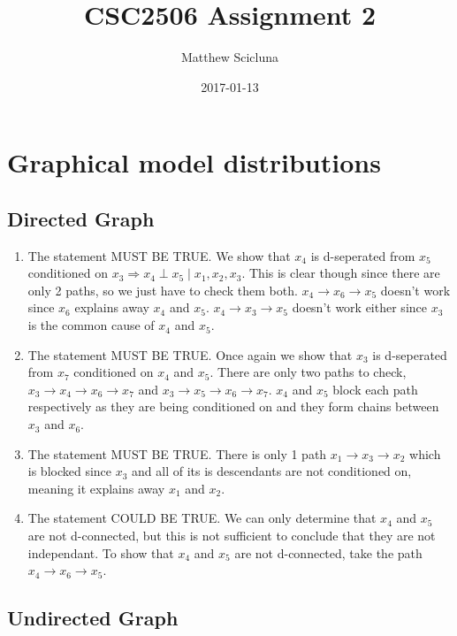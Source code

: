 \documentclass[]{article}
\title{CSC2506 Assignment 2}
\author{Matthew Scicluna}
\date{2017-01-13}
\begin{document}
\maketitle

\section{Graphical model
distributions}\label{graphical-model-distributions}

\subsection{Directed Graph}\label{directed-graph}

\begin{enumerate}
\def\labelenumi{\arabic{enumi}.}
\item
  The statement MUST BE TRUE. We show that \(x_4\) is d-seperated from
  \(x_5\) conditioned on
  \(x_3 \Rightarrow x_4 \perp x_5 \mid x_1, x_2, x_3\). This is clear
  though since there are only 2 paths, so we just have to check them
  both. \(x_4 \rightarrow x_6 \rightarrow x_5\) doesn't work since
  \(x_6\) explains away \(x_4\) and \(x_5\).
  \(x_4 \rightarrow x_3 \rightarrow x_5\) doesn't work either since
  \(x_3\) is the common cause of \(x_4\) and \(x_5\).
\item
  The statement MUST BE TRUE. Once again we show that \(x_3\) is
  d-seperated from \(x_7\) conditioned on \(x_4\) and \(x_5\). There are
  only two paths to check,
  \(x_3 \rightarrow x_4 \rightarrow x_6 \rightarrow x_7\) and
  \(x_3 \rightarrow x_5 \rightarrow x_6 \rightarrow x_7\). \(x_4\) and
  \(x_5\) block each path respectively as they are being conditioned on
  and they form chains between \(x_3\) and \(x_6\).
\item
  The statement MUST BE TRUE. There is only 1 path
  \(x_1 \rightarrow x_3 \rightarrow x_2\) which is blocked since \(x_3\)
  and all of its is descendants are not conditioned on, meaning it
  explains away \(x_1\) and \(x_2\).
\item
  The statement COULD BE TRUE. We can only determine that \(x_4\) and
  \(x_5\) are not d-connected, but this is not sufficient to conclude
  that they are not independant. To show that \(x_4\) and \(x_5\) are
  not d-connected, take the path
  \(x_4 \rightarrow x_6 \rightarrow x_5\).
\end{enumerate}

\subsection{Undirected Graph}\label{undirected-graph}
\end{document}
